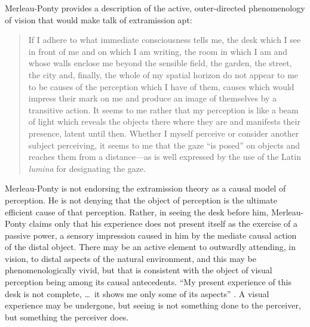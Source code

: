 Merleau-Ponty provides a description of the active, outer-directed phenomenology of vision that would make talk of extramission apt:
\begin{quote}
	If I adhere to what immediate consciousness tells me, the desk which I see in front of me and on which I am writing, the room in which I am and whose walls enclose me beyond the sensible field, the garden, the street, the city and, finally, the whole of my spatial horizon do not appear to me to be causes of the perception which I have of them, causes which would impress their mark on me and produce an image of themselves by a transitive action. It seems to me rather that my perception is like a beam of light which reveals the objects there where they are and manifests their presence, latent until then. Whether I myself perceive or consider another subject perceiving, it seems to me that the gaze ``is posed'' on objects and reaches them from a distance---as is well expressed by the use of the Latin \emph{lumina} for designating the gaze. \citep[185]{Merleau-Ponty:1967fj}
\end{quote}
Merleau-Ponty is not endorsing the extramission theory as a causal model of perception. He is not denying that the object of perception is the ultimate efficient cause of that perception. Rather, in seeing the desk before him, Merleau-Ponty claims only that his experience does not present itself as the exercise of a passive power, a sensory impression caused in him by the mediate causal action of the distal object. There may be an active element to outwardly attending, in vision, to distal aspects of the natural environment, and this may be phenomenologically vivid, but that is consistent with the object of visual perception being among its causal antecedents. ``My present experience of this desk is not complete, \ldots\ it shows me only some of its aspects'' \citep[186]{Merleau-Ponty:1967fj}. A visual experience may be undergone, but seeing is not something done to the perceiver, but something the perceiver does.

